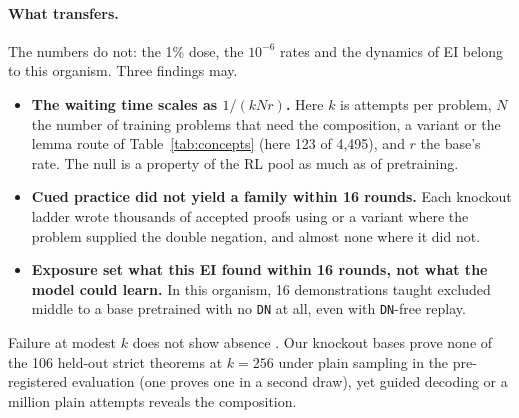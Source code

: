 \paragraph{What transfers.} The numbers do not: the 1\% dose, the $10^{-6}$ rates and the dynamics of EI belong to
this organism. Three findings may.
\begin{itemize}
\item \textbf{The waiting time scales as $1/(kNr)$.} Here $k$ is attempts per problem, $N$ the number of training
problems that need the composition, a variant or the lemma route of Table~\ref{tab:concepts} (here 123 of 4,495), and $r$ the base's rate. The null is a property of the RL pool
as much as of pretraining.
\item \textbf{Cued practice did not yield a family within 16 rounds.} Each knockout ladder wrote thousands of
accepted proofs using \sig{} or a variant where the problem supplied the double negation, and almost none where it did
not.
\item \textbf{Exposure set what this EI found within 16 rounds, not what the model could learn.} In this organism,
16 demonstrations taught excluded middle to a base pretrained with no \texttt{DN} at all, even with \texttt{DN}-free
replay.
\end{itemize}
Failure at modest $k$ does not show absence \citep{brown2024monkeys,hofstatter2025elicitation}. Our knockout bases prove
none of the 106 held-out strict theorems at $k=256$ under plain sampling in the pre-registered evaluation (one proves
one in a second draw), yet guided decoding or a million plain attempts reveals the composition.
